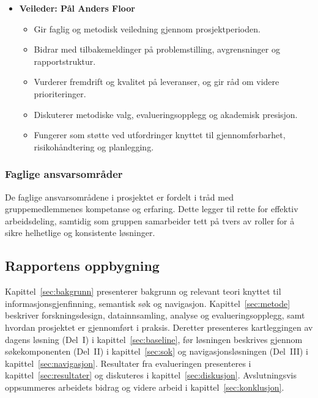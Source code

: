\begin{itemize}
    \item \textbf{Veileder: Pål Anders Floor}
        \begin{itemize}
            \item Gir faglig og metodisk veiledning gjennom prosjektperioden.
            \item Bidrar med tilbakemeldinger på problemstilling, avgrensninger og rapportstruktur.
            \item Vurderer fremdrift og kvalitet på leveranser, og gir råd om videre prioriteringer.
            \item Diskuterer metodiske valg, evalueringsopplegg og akademisk presisjon.
            \item Fungerer som støtte ved utfordringer knyttet til gjennomførbarhet, risikohåndtering og planlegging.
        \end{itemize}
\end{itemize}

\subsubsection{Faglige ansvarsområder}

De faglige ansvarsområdene i prosjektet er fordelt i tråd med gruppemedlemmenes kompetanse og erfaring. Dette legger til rette for effektiv arbeidsdeling, samtidig som gruppen samarbeider tett på tvers av roller for å sikre helhetlige og konsistente løsninger.

\subsection{Rapportens oppbygning}
\label{sec:oppbygning}

Kapittel~\ref{sec:bakgrunn} presenterer bakgrunn og relevant teori knyttet til informasjonsgjenfinning, semantisk søk og navigasjon. Kapittel~\ref{sec:metode} beskriver forskningsdesign, datainnsamling, analyse og evalueringsopplegg, samt hvordan prosjektet er gjennomført i praksis. Deretter presenteres kartleggingen av dagens løsning (Del~I) i kapittel~\ref{sec:baseline}, før løsningen beskrives gjennom søkekomponenten (Del~II) i kapittel~\ref{sec:sok} og navigasjonsløsningen (Del~III) i kapittel~\ref{sec:navigasjon}. Resultater fra evalueringen presenteres i kapittel~\ref{sec:resultater} og diskuteres i kapittel~\ref{sec:diskusjon}. Avslutningsvis oppsummeres arbeidets bidrag og videre arbeid i kapittel~\ref{sec:konklusjon}.
